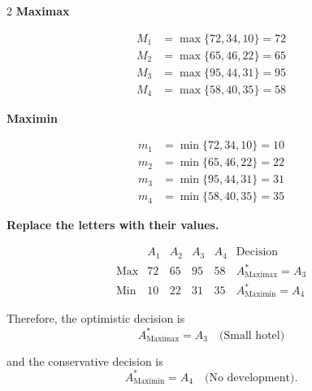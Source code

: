 {\begin{multicols}{2}
			\textbf{Maximax}
			
			\[
			\begin{array}{ll}
				M_1 &= \max\{72,34,10\}=72\\
				M_2 &= \max\{65,46,22\}=65\\
				M_3 &= \max\{95,44,31\}=95\\
				M_4 &= \max\{58,40,35\}=58
			\end{array}
			\]
			
			\textbf{Maximin}
			
			\[
			\begin{array}{ll}
				m_1 &= \min\{72,34,10\}=10\\
				m_2 &= \min\{65,46,22\}=22\\
				m_3 &= \min\{95,44,31\}=31\\
				m_4 &= \min\{58,40,35\}=35
			\end{array}
			\]
			
			\columnbreak
			
			\textbf{Replace the letters with their values.}
			
			\[
			\begin{array}{c|ccccc}
				& A_1 & A_2 & A_3 & A_4 & \text{Decision}\\
				\hline
				\text{Max} &
				72 & 65 & 95 & 58 &
				A^*_{\mathrm{Maximax}}=A_3
				\\
				\text{Min} &
				10 & 22 & 31 & 35 &
				A^*_{\mathrm{Maximin}}=A_4
			\end{array}
			\]
			
			Therefore, the optimistic decision is
			\[
			A^*_{\mathrm{Maximax}}=A_3
			\quad\text{(Small hotel)}
			\]
			
			and the conservative decision is
			\[
			A^*_{\mathrm{Maximin}}=A_4
			\quad\text{(No development)}.
			\]
			
		\end{multicols}
	}
		
